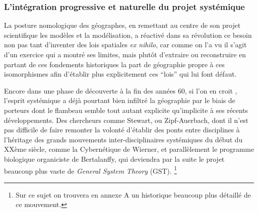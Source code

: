 


\subsubsection{L'intégration progressive et naturelle du projet systémique}
\label{sssec:progressive_systemique}

La posture nomologique des géographes, en remettant au centre de son projet scientifique les modèles et la modélisation, a réactivé dans sa révolution ce besoin non pas tant d'inventer des lois spatiales \textit{ex nihilo}, car comme on l'a vu il s'agit d'un exercice qui a montré ses limites, mais plutôt d'extraire ou reconstruire en partant de ces fondements historiques la part de géographie propre à ces isomorphismes afin d'établir plus explicitement ces \enquote{lois} qui lui font défaut.

Encore dans une phase de découverte à la fin des années 60, si l'on en croit \textcite{Harvey1969}, l'esprit systémique \textcite{Ackerman1963} a déjà pourtant bien infiltré la géographie par le biais de porteurs dont le flambeau semble tout autant explicite qu'implicite à ses récents développements. Des chercheurs comme Stewart, ou Zipf-Auerbach, dont il n'est pas difficile de faire remonter la volonté d'établir des ponts entre disciplines à l'héritage des grands mouvements inter-disciplinaires systémiques du début du XXème siècle, comme la Cybernétique de Wierner, et parallèlement le programme biologique organiciste de Bertalanffy, qui deviendra par la suite le projet beaucoup plus vaste de \textit{General System Theory} (GST). \footnote{Sur ce sujet on trouvera en annexe A un historique beaucoup plus détaillé de ce mouvement.}

